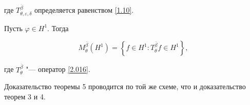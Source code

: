 где $T_{\theta,\varepsilon,\delta}^{\overline{\beta}}$ определяется равенством \eqref{1.10}.



\begin{theorem}[5]

    Пусть $\varphi\in H^1${\rm .} Тогда

    \begin{equation}\nonumber

        M_\theta^{\overline{\beta}}(H^1)=\left\{f\in H^1: T_\theta^{\overline{\beta}} f\in

    H^1\right\},

    \end{equation}

где $T_\theta^{\overline{\beta}}$ "--- оператор \eqref{2.016}{\rm .}

\end{theorem}



Доказательство теоремы 5 проводится по той же схеме, что и доказательство теорем 3 и 4.







